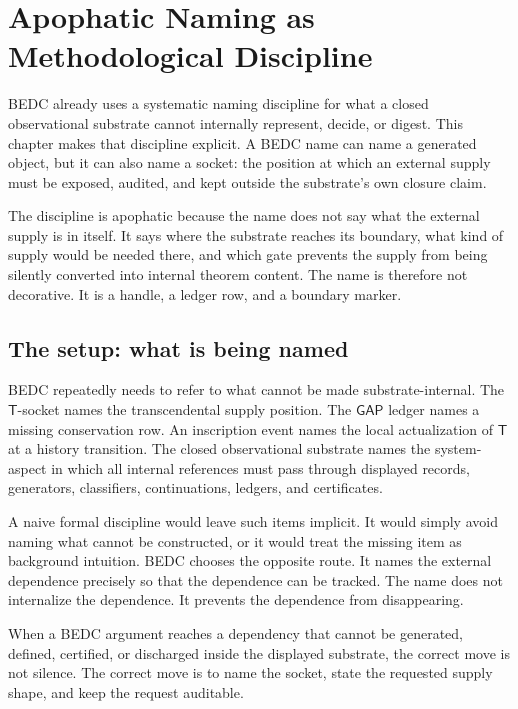 \chapter{Apophatic Naming as Methodological Discipline}
\label{ch:visions-apophatic-naming-as-discipline}

BEDC already uses a systematic naming discipline for what a closed observational substrate cannot internally represent, decide, or digest. This chapter makes that discipline explicit. A BEDC name can name a generated object, but it can also name a socket: the position at which an external supply must be exposed, audited, and kept outside the substrate's own closure claim.

The discipline is apophatic because the name does not say what the external supply is in itself. It says where the substrate reaches its boundary, what kind of supply would be needed there, and which gate prevents the supply from being silently converted into internal theorem content. The name is therefore not decorative. It is a handle, a ledger row, and a boundary marker.

\section{The setup: what is being named}
\label{sec:apophatic-naming-setup}

BEDC repeatedly needs to refer to what cannot be made substrate-internal. The $\mathsf{T}$-socket names the transcendental supply position. The $\mathsf{GAP}$ ledger names a missing conservation row. An inscription event names the local actualization of $\mathsf{T}$ at a history transition. The closed observational substrate names the system-aspect in which all internal references must pass through displayed records, generators, classifiers, continuations, ledgers, and certificates.

A naive formal discipline would leave such items implicit. It would simply avoid naming what cannot be constructed, or it would treat the missing item as background intuition. BEDC chooses the opposite route. It names the external dependence precisely so that the dependence can be tracked. The name does not internalize the dependence. It prevents the dependence from disappearing.

\begin{principle}
\label{prin:apophatic-naming-named-externality}
When a BEDC argument reaches a dependency that cannot be generated, defined, certified, or discharged inside the displayed substrate, the correct move is not silence. The correct move is to name the socket, state the requested supply shape, and keep the request auditable.
\end{principle}

